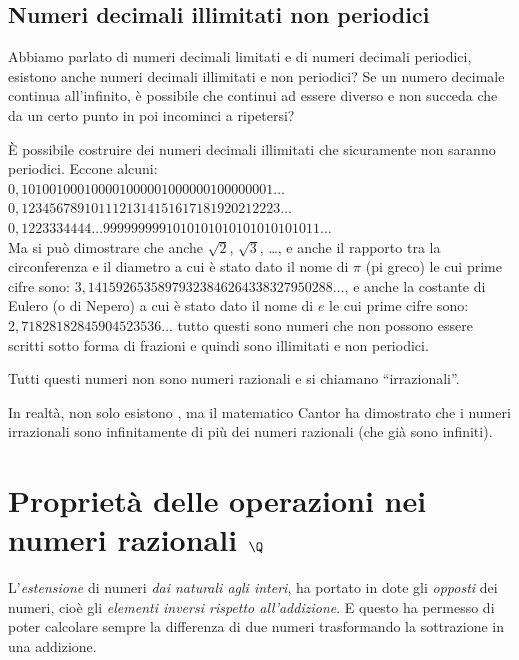\subsection{Numeri decimali illimitati non periodici}

Abbiamo parlato di numeri decimali limitati e di numeri decimali 
periodici, esistono anche numeri decimali illimitati e non periodici?
Se un numero decimale continua all'infinito, è possibile che continui ad 
essere diverso e non succeda che da un certo punto in poi incominci a 
ripetersi?

È possibile costruire dei numeri decimali illimitati che sicuramente non 
saranno periodici. Eccone alcuni:\\
\(0,101001000100001000001000000100000001\dots\)\\
\(0,1234567891011121314151617181920212223\dots\)\\
\(0,1223334444\dots9999999991010101010101010101011\dots\)\\
Ma si può dimostrare che anche \(\sqrt{2}\), \(\sqrt{3}\), \dots, 
e anche il rapporto tra la circonferenza e il diametro a cui è stato dato 
il nome di \(\pi\) (pi greco) le cui prime cifre sono: 
\(3,14159265358979323846264338327950288\!\dots\), 
e anche la costante di Eulero (o di Nepero) a cui è stato dato il nome di 
\(e\) le cui prime cifre sono:
\(2,71828182845904523536\!\dots\)
tutto questi sono 
numeri che non possono essere scritti sotto forma di frazioni e quindi 
sono illimitati e non periodici.

Tutti questi numeri non sono numeri razionali e si chiamano 
``irrazionali''.

\begin{osservazione}{}{}
In realtà, non solo esistono , ma il matematico Cantor 
ha dimostrato che i numeri irrazionali sono infinitamente di più dei numeri 
razionali (che già sono infiniti).
\end{osservazione}

\section{Proprietà delle operazioni nei numeri razionali $\Q$}
\label{sec:razionali_proprieta}

L'\emph{estensione} di numeri \emph{dai naturali agli interi}, 
ha portato in dote gli \emph{opposti} dei numeri, cioè gli 
\emph{elementi inversi rispetto all'addizione}. 
E questo ha permesso di poter calcolare sempre la differenza di due numeri 
trasformando la sottrazione in una addizione.


